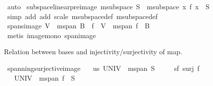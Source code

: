\begin{isabellebody}
\ auto%
\endisatagproof
{\isafoldproof}%
%
\isadelimproof
\isanewline
%
\endisadelimproof
\isanewline
{}\isamarkupfalse%
\ subspace{\isacharunderscore}{\kern0pt}linear{\isacharunderscore}{\kern0pt}preimage{\isacharcolon}{\kern0pt}\ {\isachardoublequoteopen}m{}{\isachardot}{\kern0pt}subspace\ S\ {\isasymLongrightarrow}\ m{}{\isachardot}{\kern0pt}subspace\ {\isacharbraceleft}{\kern0pt}x{\isachardot}{\kern0pt}\ f\ x\ {\isasymin}\ S{\isacharbraceright}{\kern0pt}{\isachardoublequoteclose}\isanewline
%
\isadelimproof
\ \ %
\endisadelimproof
%
\isatagproof
{}\isamarkupfalse%
\ {\isacharparenleft}{\kern0pt}simp\ add{\isacharcolon}{\kern0pt}\ add\ scale\ m{}{\isachardot}{\kern0pt}subspace{\isacharunderscore}{\kern0pt}def\ m{}{\isachardot}{\kern0pt}subspace{\isacharunderscore}{\kern0pt}def{\isacharparenright}{\kern0pt}%
\endisatagproof
{\isafoldproof}%
%
\isadelimproof
\isanewline
%
\endisadelimproof
\isanewline
{}\isamarkupfalse%
\ spans{\isacharunderscore}{\kern0pt}image{\isacharcolon}{\kern0pt}\ {\isachardoublequoteopen}V\ {\isasymsubseteq}\ m{}{\isachardot}{\kern0pt}span\ B\ {\isasymLongrightarrow}\ f\ {\isacharbackquote}{\kern0pt}\ V\ {\isasymsubseteq}\ m{}{\isachardot}{\kern0pt}span\ {\isacharparenleft}{\kern0pt}f\ {\isacharbackquote}{\kern0pt}\ B{\isacharparenright}{\kern0pt}{\isachardoublequoteclose}\isanewline
%
\isadelimproof
\ \ %
\endisadelimproof
%
\isatagproof
{}\isamarkupfalse%
\ {\isacharparenleft}{\kern0pt}metis\ image{\isacharunderscore}{\kern0pt}mono\ span{\isacharunderscore}{\kern0pt}image{\isacharparenright}{\kern0pt}%
\endisatagproof
{\isafoldproof}%
%
\isadelimproof
%
\endisadelimproof
%
\begin{isamarkuptext}%
Relation between bases and injectivity/surjectivity of map.%
\end{isamarkuptext}\isamarkuptrue%
\isamarkupfalse%
\ spanning{\isacharunderscore}{\kern0pt}surjective{\isacharunderscore}{\kern0pt}image{\isacharcolon}{\kern0pt}\isanewline
\ \ \ us{\isacharcolon}{\kern0pt}\ {\isachardoublequoteopen}UNIV\ {\isasymsubseteq}\ m{}{\isachardot}{\kern0pt}span\ S{\isachardoublequoteclose}\isanewline
\ \ \ \ \ sf{\isacharcolon}{\kern0pt}\ {\isachardoublequoteopen}surj\ f{\isachardoublequoteclose}\isanewline
\ \ \ {\isachardoublequoteopen}UNIV\ {\isasymsubseteq}\ m{}{\isachardot}{\kern0pt}span\ {\isacharparenleft}{\kern0pt}f\ {\isacharbackquote}{\kern0pt}\ S{\isacharparenright}{\kern0pt}{\isachardoublequoteclose}\isanewline

\end{isabellebody}
